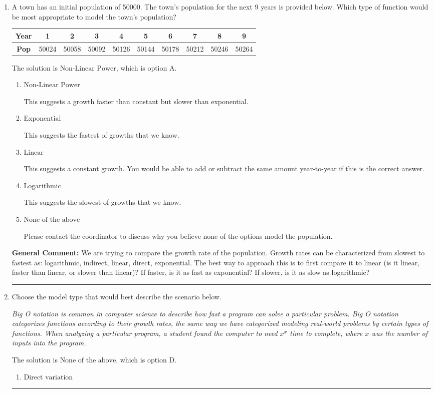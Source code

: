 \documentclass{extbook}[14pt]
\newcommand{\litem}[1]{\item #1

\rule{\textwidth}{0.4pt}}
\begin{document}
\begin{enumerate}\litem{
A town has an initial population of 50000. The town's population for the next 9 years is provided below. Which type of function would be most appropriate to model the town's population?


\begin{tabular}{c|c|c|c|c|c|c|c|c|c}
\textbf{Year} &1 &2 &3 &4 &5 &6 &7 &8 &9\tabularnewline \hline
\textbf{Pop} &50024 &50058 &50092 &50126 &50144 &50178 &50212 &50246 &50264\end{tabular}The solution is \( \text{Non-Linear Power} \), which is option A.\begin{enumerate}[label=\Alph*.]
\item \( \text{Non-Linear Power} \)

This suggests a growth faster than constant but slower than exponential.
\item \( \text{Exponential} \)

This suggests the fastest of growths that we know.
\item \( \text{Linear} \)

This suggests a constant growth. You would be able to add or subtract the same amount year-to-year if this is the correct answer.
\item \( \text{Logarithmic} \)

This suggests the slowest of growths that we know.
\item \( \text{None of the above} \)

Please contact the coordinator to discuss why you believe none of the options model the population.
\end{enumerate}

\textbf{General Comment:} We are trying to compare the growth rate of the population. Growth rates can be characterized from slowest to fastest as: logarithmic, indirect, linear, direct, exponential. The best way to approach this is to first compare it to linear (is it linear, faster than linear, or slower than linear)? If faster, is it as fast as exponential? If slower, is it as slow as logarithmic?
}
\litem{
Choose the model type that would best describe the scenario below.

\begin{center}
    \textit{ Big O notation is common in computer science to describe how fast a program can solve a particular problem. Big O notation categorizes functions according to their growth rates, the same way we have categorized modeling real-world problems by certain types of functions. When analyzing a particular program, a student found the computer to need $x^x$ time to complete, where $x$ was the number of inputs into the program. }
\end{center}
The solution is \( \text{None of the above} \), which is option D.\begin{enumerate}[label=\Alph*.]
\item \( \text{Direct variation} \)



\end{enumerate}}
\end{enumerate}
\end{document}
